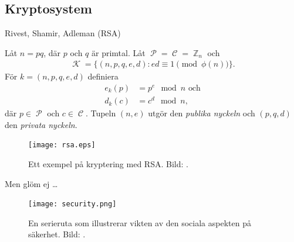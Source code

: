 \documentclass{beamer}
\theoremstyle{definition}
\DeclareMathOperator{\p}{\mathcal{P}}
\let\P\p
\DeclareMathOperator{\C}{\mathcal{C}}
\DeclareMathOperator{\K}{\mathcal{K}}
\DeclareMathOperator{\Z}{\mathbb{Z}}
\let\stoch\mathbf
\renewcommand{\p}{\stoch P}
\begin{document}

\subsection{Kryptosystem}

\begin{frame}{\insertsubsectionhead}{Rivest, Shamir, Adleman (RSA)}
  \begin{definition}
    Låt \(n = pq\), där \(p\) och \(q\) är primtal.
    Låt \(\P = \C = \Z_n\) och
    \begin{align*}
      \K = \{ (n, p, q, e, d)\colon ed\equiv 1\pmod{\phi(n)}\}.
    \end{align*}
    För \(k = (n, p, q, e, d)\) definiera
    \begin{align*}
      e_k(p) &= p^e\mod n \text{ och} \\
      d_k(c) &= c^d\mod n,
    \end{align*}
    där \(p\in \P\) och \(c\in \C\).
    Tupeln \((n, e)\) utgör den \emph{publika nyckeln} och \((p, q, d)\) den 
    \emph{privata nyckeln}.
  \end{definition}
\end{frame}

\begin{frame}{\insertsubsectionhead}
  \begin{figure}
    \texttt{[image: rsa.eps]}
    \caption{Ett exempel på kryptering med RSA.
      Bild: \cite{Stallings2011can}.}
  \end{figure}
\end{frame}

\begin{frame}{\insertsubsectionhead}{Men glöm ej \dots}
  \begin{figure}
    \texttt{[image: security.png]}
    \caption{En serieruta som illustrerar vikten av den sociala aspekten på 
      säkerhet.
      Bild: \cite{xkcd538}.}
  \end{figure}
\end{frame}


\end{document}

